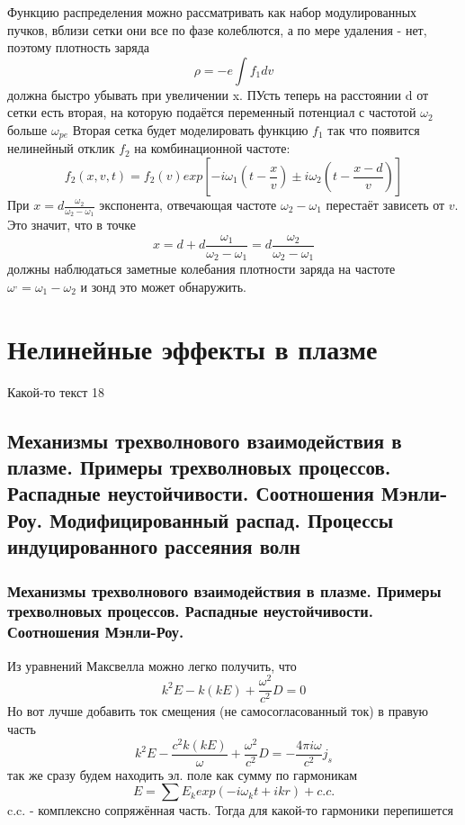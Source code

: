 \documentclass[10pt, a4paper]{article}
\let\stdsection\section
\renewcommand\section{\newpage\stdsection}
\begin{document}
Функцию распределения можно рассматривать как набор модулированных пучков, вблизи сетки они все по фазе колеблются, а по мере удаления - нет, поэтому плотность заряда
\begin{equation}
	\rho = -e \int f_1 dv
\end{equation}
должна быстро убывать при увеличении x.
ПУсть теперь на расстоянии d от сетки есть вторая, на которую подаётся переменный потенциал с частотой $\omega_2$ больше $\omega_{pe}$
Вторая сетка будет моделировать функцию $f_1$ так что появится нелинейный отклик $f_2$ на комбинационной частоте:
\begin{equation}
	f_2 (x,v,t)=f_2 (v) exp[-i \omega_1 (t-\frac{x}{v}) \pm i \omega_2 (t- \frac{x-d}{v})]
\end{equation}
При $x=d\frac{\omega_2}{\omega_2-\omega_1}$ экспонента, отвечающая частоте $\omega_2-\omega_1$ перестаёт зависеть от $v$. Это значит, что в точке
\begin{equation}
	x=d+d \frac{\omega_1}{\omega_2-\omega_1}=d  \frac{\omega_2}{\omega_2-\omega_1}
\end{equation}
должны наблюдаться заметные колебания плотности заряда на частоте $\omega^{,} = \omega_1-\omega_2 $ и зонд это может обнаружить.


\section{Нелинейные эффекты в плазме}

Какой-то текст 18

\subsection{Механизмы трехволнового взаимодействия в плазме. Примеры трехволновых процессов. Распадные неустойчивости. Соотношения Мэнли-Роу. Модифицированный распад. Процессы индуцированного рассеяния волн}
\label{subsec:3waveinterractive}

\subsubsection{Механизмы трехволнового взаимодействия в плазме. Примеры трехволновых процессов. Распадные неустойчивости. Соотношения Мэнли-Роу.}

Из уравнений Максвелла можно легко получить, что
\begin{equation}
	k^2 E - k (kE)+\frac{\omega^2}{c^2} D =0
\end{equation}
Но вот лучше добавить ток смещения (не самосогласованный ток) в правую часть
\begin{equation}
	k^2 E - \frac{c^2 k (kE)}{\omega}+\frac{\omega^2}{c^2} D =-\frac{4 \pi i \omega}{c^2} j_{s}
\end{equation}
так же сразу будем находить эл. поле как сумму по гармоникам
\begin{equation}
	E=\sum E_k exp(-i \omega_k t + ikr) + c.c.
\end{equation}
c.c. - комплексно сопряжённая часть.
Тогда для какой-то гармоники перепишется 
\end{document}
